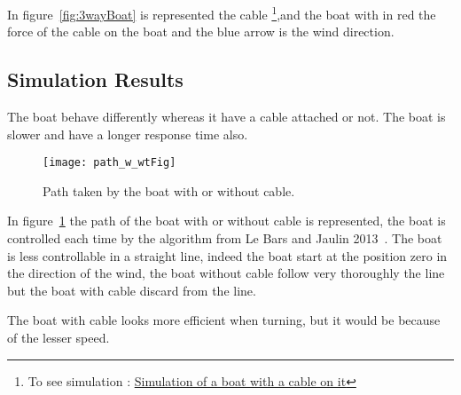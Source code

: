 In figure~\ref{fig:3wayBoat} is represented the cable \footnote{To see simulation : \href{https://www.youtube.com/watch?v=1nrbdikXr8A}{Simulation of a boat with a cable on it}},and the boat with in red the force of the cable on the boat and the blue arrow is the wind direction.

\subsection{Simulation Results}

The boat behave differently whereas it have a cable attached or not. The boat is slower and have a longer response time also.

\begin{figure}[H]
\centering
    \texttt{[image: path\_w\_wtFig]}
    \caption{Path taken by the boat with or without cable.}
    \label{fig:pathBoat}
\end{figure}

In figure~\ref{fig:pathBoat} the path of the boat with or without cable is represented, the boat is controlled each time by the algorithm from Le Bars and Jaulin 2013~\cite{LeBars2013}. The boat is less controllable in a straight
line, indeed the boat start at the position zero in the direction of the wind, the boat without cable follow very thoroughly the line but the boat with cable discard from the line.

The boat with cable looks more efficient when turning, but it would be because of the lesser speed.

